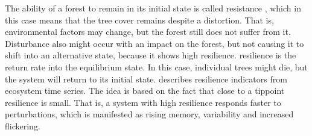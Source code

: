 The ability of a forest to remain in its initial state is called \gls{resistance} \citep[compare glossary for definitions, e.g.][]{keersmaecker2014}, which in this case means that the tree cover remains despite a distortion. That is, environmental factors may change, but the forest still does not suffer from it. Disturbance also might occur with an impact on the forest, but not causing it to shift into an alternative state, because it shows high \gls{resilience}. \Gls{resilience} is the return rate into the equilibrium state. In this case, individual trees might die, but the system will return to its initial state. \cite{dakos2014} describes resilience indicators from ecosystem time series. The idea is based on the fact that close to a \gls{tippoint} resilience is small. That is, a system with high resilience responds faster to perturbations, which is manifested as rising memory, variability and increased \gls{flickering}.\\

